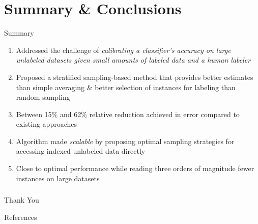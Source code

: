 \documentclass[11pt]{beamer}
\newlength{\wideitemsep}
\let\olditem\item
\renewcommand{\item}{\setlength{\itemsep}{\wideitemsep}\olditem}
\begin{document}

\section{Summary \& Conclusions}
\begin{frame}{Summary}
\begin{enumerate}
\item Addressed the challenge of \emph{calibrating a classifier's accuracy on large unlabeled datasets given small amounts of labeled data and a human labeler}
\item Proposed a stratified sampling-based method that provides better estimates than simple averaging \& better selection of instances for labeling than random sampling 
\item Between 15\% and 62\% relative reduction achieved in error compared to existing approaches
\item Algorithm made \emph{scalable} by proposing optimal sampling strategies for accessing indexed unlabeled data directly
\item Close to optimal performance while reading three orders of magnitude fewer instances on large datasets 
\end{enumerate}
\end{frame}

\begin{frame}
\frametitle{}
\begin{center}
\LARGE{Thank You}
\end{center}
\end{frame}


\begin{frame}[allowframebreaks]{References}

\end{frame}
\end{document}
